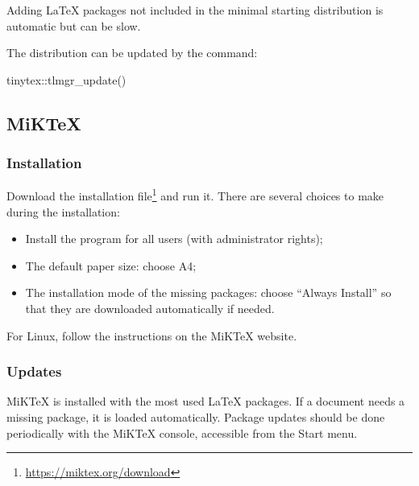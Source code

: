 \documentclass[
  12pt,
  american,
  a4paper,
  extrafontsizes,onecolumn,openright
  ]{memoir}
\newenvironment{Shaded}{\begin{snugshade}}{\end{snugshade}}
\newcommand{\FunctionTok}[1]{\textcolor[rgb]{0.00,0.00,0.00}{#1}}
\newcommand{\NormalTok}[1]{#1}
\newcommand{\SpecialCharTok}[1]{\textcolor[rgb]{0.00,0.00,0.00}{#1}}
\providecommand{\tightlist}{%
  \setlength{\itemsep}{0pt}\setlength{\parskip}{0pt}}
\begin{document}
\normalsize

Adding LaTeX packages not included in the minimal starting distribution is automatic but can be slow.

The distribution can be updated by the command:

\scriptsize

\begin{Shaded}
\begin{Highlighting}[]
\NormalTok{tinytex}\SpecialCharTok{::}\FunctionTok{tlmgr\_update}\NormalTok{()}
\end{Highlighting}
\end{Shaded}

\normalsize

\hypertarget{miktex}{%
\subsection{MiKTeX}\label{miktex}}

\hypertarget{installation-2}{%
\subsubsection{Installation}\label{installation-2}}

Download the installation file\footnote{\url{https://miktex.org/download}} and run it.
There are several choices to make during the installation:

\begin{itemize}
\tightlist
\item
  Install the program for all users (with administrator rights);
\item
  The default paper size: choose A4;
\item
  The installation mode of the missing packages: choose \enquote{Always Install} so that they are downloaded automatically if needed.
\end{itemize}

For Linux, follow the instructions on the MiKTeX website.

\hypertarget{updates}{%
\subsubsection{Updates}\label{updates}}

MiKTeX is installed with the most used LaTeX packages.
If a document needs a missing package, it is loaded automatically.
Package updates should be done periodically with the MiKTeX console, accessible from the Start menu.
\end{document}
